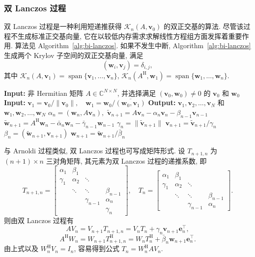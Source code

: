 \subsubsection{{双 Lanczos 过程}}\label{subsec:bi-lanczos-process}
{双 Lanczos 过程是一种利用短递推获得 $\mathcal K_n(A,\bm v_0)$ 的双正交基的算法. 尽管该过程不生成标准正交基向量, 它在以较低内存需求求解线性方程组方面发挥着重要作用. 算法见 Algorithm~\ref{alg:bi-lanczos}.}
{如果不发生中断, Algorithm~\ref{alg:bi-lanczos} 生成两个 Krylov 子空间的双正交基向量, 满足}
\[(\bm w_i,\bm v_j)=\delta_{i,j},\]
{其中 $\mathcal K_n(A,\bm v_1)=\operatorname{span}\{\bm v_1,\ldots,\bm v_n\}$, $\mathcal K_n(A^{\mathrm H},\bm w_1)=\operatorname{span}\{\bm w_1,\ldots,\bm w_n\}$.}
\begin{algorithm}[H]\caption{{双 Lanczos 过程}}\label{alg:bi-lanczos}
\begin{algorithmic}[1]
\Statex\textbf{Input:} {非 Hermitian 矩阵 $A\in\mathbb C^{N\times N}$, 并选择满足 $(\bm v_0,\bm w_0)\ne0$ 的 $\bm v_0$ 和 $\bm w_0$}
\Statex\textbf{Input:} $\bm v_1=\bm v_0/\|\bm v_0\|,\quad\bm w_1=\bm w_0/\overline{(\bm w_0,\bm v_1)}$
\Statex\textbf{Output:} $\bm v_1,\bm v_2,\ldots,\bm v_N$ {和} $\bm w_1,\bm w_2,\ldots,\bm w_N$
\State $\alpha_n=(\bm w_n,A\bm v_n),$
\State $\tilde{\bm v}_{n+1}=A\bm v_n-\alpha_n\bm v_n-\beta_{n-1}\bm v_{n-1}$
\State $\tilde{\bm w}_{n+1}=A^{\mathrm H}\bm w_n-\bar\alpha_n\bm w_n-\bar\gamma_{n-1}\bm w_{n-1}$
\State $\gamma_n=\|\tilde{\bm v}_{n+1}\|$
\State $\bm v_{n+1}=\tilde{\bm v}_{n+1}/\gamma_n$
\State $\beta_n=(\tilde{\bm w}_{n+1},\bm v_{n+1})$
\State $\bm w_{n+1}=\tilde{\bm w}_{n+1}/\bar\beta_n$
\EndFor
\end{algorithmic}\end{algorithm}
{与 Arnoldi 过程类似, 双 Lanczos 过程也可写成矩阵形式. 设 $T_{n+1,n}$ 为 $(n+1)\times n$ 三对角矩阵, 其元素为双 Lanczos 过程的递推系数, 即}
\[
T_{n+1,n}=\begin{bmatrix}
\alpha_1&\beta_1&&\\
\gamma_1&\alpha_2&\ddots&\\
&\ddots&\ddots&\beta_{n-1}\\
&&\gamma_{n-1}&\alpha_n\\
&&&\gamma_n
\end{bmatrix},\quad
T_n=\begin{bmatrix}
\alpha_1&\beta_1&&\\
\gamma_1&\alpha_2&\ddots&\\
&\ddots&\ddots&\beta_{n-1}\\
&&\gamma_{n-1}&\alpha_n
\end{bmatrix}.
\]
{则由双 Lanczos 过程有}
\begin{equation}\label{eq:bilanczos-matrix-relation}
AV_n=V_{n+1}T_{n+1,n}=V_nT_n+\gamma_n\bm v_{n+1}\bm e_n^\top,
\end{equation}
\[
A^{\mathrm H}W_n=W_{n+1}T_{n+1,n}^{\mathrm H}
=W_nT_n^{\mathrm H}+\bar\beta_n\bm w_{n+1}\bm e_n^\top.
\]
{由上式以及 $W_n^{\mathrm H}V_n=I_n$, 容易得到公式 $T_n=W_n^{\mathrm H}AV_n$.}
